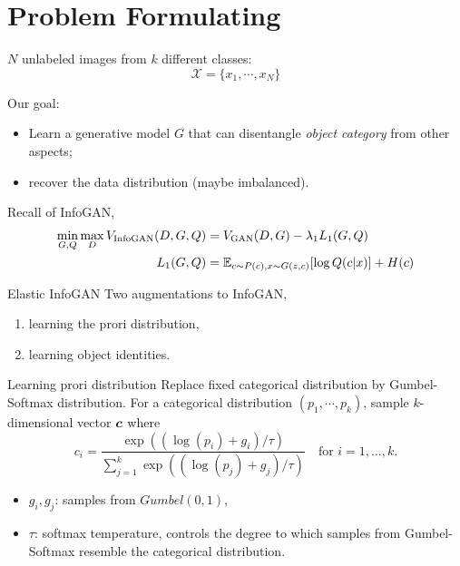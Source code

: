 \documentclass[xcolor={svgnames}]{beamer}
\begin{document}

\section{Problem Formulating}
\begin{frame}
  $N$ unlabeled images from $k$ different classes:
  \[
    \mathcal{X} = \{x_1, \cdots, x_N\}
  \]

  Our goal:
  \begin{itemize}
    \item Learn a generative model $G$ that can disentangle \emph{object category}
      from other aspects;
    \item recover the data distribution (maybe imbalanced).
  \end{itemize}
\end{frame}


\begin{frame}
  Recall of InfoGAN,
  \[
  \begin{split}
    \min_{G,Q} \max_D V_{\text{InfoGAN}}(D, G, Q) &= 
    V_{\text{GAN}}(D,G) - \lambda_1 L_1(G,Q) \\
        L_1(G,Q) &= \mathbb{E}{}_{c\sim P(c), x\sim G(z,c)}[\log Q(c|x)] + H(c)
  \end{split}
  \]
\end{frame}


\begin{frame}{Elastic InfoGAN}
  Two augmentations to InfoGAN,
  \begin{enumerate}
    \item learning the prori distribution,
    \item learning object identities.
  \end{enumerate}
\end{frame}


\begin{frame}{Learning prori distribution}
  Replace fixed categorical distribution by Gumbel-Softmax distribution. For a
  categorical distribution $(p_1, \cdots, p_k)$, sample $k$-dimensional vector
  $\boldsymbol{c}$ where
  \[
    c_i = \frac{\exp((\log(p_i) + g_i) / \tau)}
    {\sum_{j=1}^k \exp((\log(p_j) + g_j) / \tau)}
    \quad \text{for } i = 1, \dots, k.
  \]

  \begin{itemize}
    \item $g_i, g_j$: samples from $Gumbel(0,1)$,
    \item $\tau$: softmax temperature, controls the degree to which samples 
      from Gumbel-Softmax resemble the categorical distribution.
  \end{itemize}
\end{frame}
\end{document}
